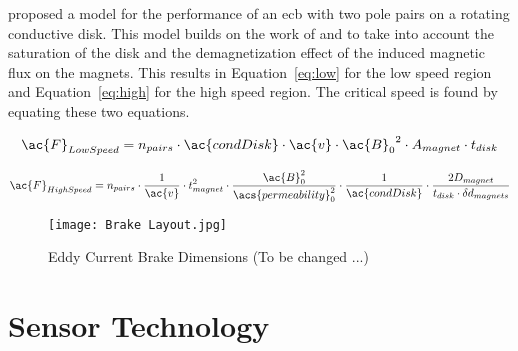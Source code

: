\cite{Baum:2016} proposed a model for the performance of an \ac{ecb} with two pole pairs on a rotating conductive disk. This model builds on the work of \cite{Smythe:1950} and \cite{Wouterse:1991} to take into account the saturation of the disk and the demagnetization effect of the induced magnetic flux on the magnets. This results in Equation~\ref{eq:low} for the low speed region and Equation~\ref{eq:high} for the high speed region. The critical speed is found by equating these two equations.

\begin{equation}
	\ac{F}_{Low Speed} = n_{pairs} \cdot \ac{condDisk} \cdot \ac{v} \cdot {\ac{B}_0}^2 \cdot A_{magnet} \cdot t_{disk}
	\label{eq:low}
\end{equation}

\begin{equation}
	\ac{F}_{High Speed} = n_{pairs} \cdot \frac{1}{\ac{v}} \cdot t_{magnet}^2 \cdot \frac{\ac{B}_0^2}{\acs{permeability}_0^2} \cdot \frac{1}{\ac{condDisk}} \cdot \frac{2 D_{magnet}}{t_{disk} \cdot \delta d_{magnets}}
	\label{eq:high}
\end{equation}

\begin{figure}[H]
	\begin{center}
		\texttt{[image: Brake Layout.jpg]}
		\caption{Eddy Current Brake Dimensions (To be changed ...)}
		\label{fig:EB}
	\end{center}
\end{figure}

\section{Sensor Technology}


